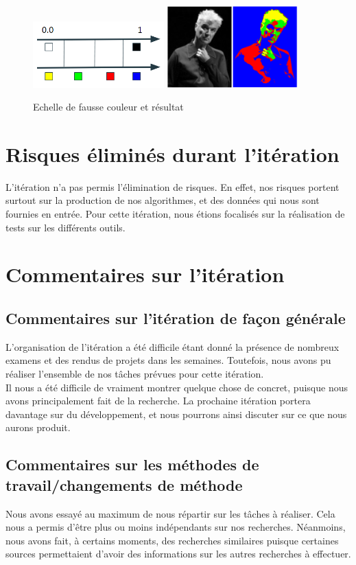 \documentclass[12pt,titlepage,french]{article}
\begin{document}
\begin{figure}[!hbtp]
  \caption{\label{} Echelle de fausse couleur et résultat}
  \includegraphics[width=0.45\textwidth]{./img/false_color_scale.png}
  \includegraphics[width=0.45\textwidth]{./img/false_color.png}
\end{figure}
\section{Risques éliminés durant l'itération}
L'itération n'a pas permis l'élimination de risques. En effet, nos risques portent surtout sur la production de nos algorithmes, et des données qui nous sont fournies en entrée. Pour cette itération, nous étions focalisés sur la réalisation de tests sur les différents outils.

\section{Commentaires sur l'itération}

\subsection{Commentaires sur l'itération de façon générale}
L'organisation de l'itération a été difficile étant donné la présence de nombreux examens et des rendus de projets dans les semaines. Toutefois, nous avons pu réaliser l'ensemble de nos tâches prévues pour cette itération.\\
Il nous a été difficile de vraiment montrer quelque chose de concret, puisque nous avons principalement fait de la recherche. La prochaine itération portera davantage sur du développement, et nous pourrons ainsi discuter sur ce que nous aurons produit.

\subsection{Commentaires sur les méthodes de travail/changements de méthode}
Nous avons essayé au maximum de nous répartir sur les tâches à réaliser. Cela nous a permis d'être plus ou moins indépendants sur nos recherches. Néanmoins, nous avons fait, à certains moments, des recherches similaires puisque certaines sources permettaient d'avoir des informations sur les autres recherches à effectuer.
\end{document}
